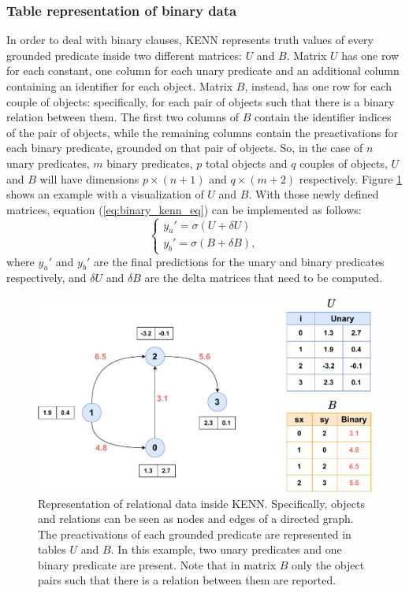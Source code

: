 \subsubsection{Table representation of binary data}

In order to deal with binary clauses, KENN represents truth values of every grounded predicate inside two different matrices: $U$ and $B$. Matrix $U$ has one row for each constant, one column for each unary predicate and an additional column containing an identifier for each object. Matrix $B$, instead, has one row for each couple of objects: specifically, for each pair of objects such that there is a binary relation between them. The first two columns of $B$ contain the identifier indices of the pair of objects, while the remaining columns contain the preactivations for each binary predicate, grounded on that pair of objects. So, in the case of $n$ unary predicates, $m$ binary predicates, $p$ total objects and $q$ couples of objects, $U$ and $B$ will have dimensions $p \times (n+1)$ and $ q \times (m+2)$ respectively. Figure \ref{fig:KENNrelationalrepr} shows an example with a visualization of $U$ and $B$. With those newly defined matrices, equation (\ref{eq:binary_kenn_eq}) can be implemented as follows:
\begin{equation*}
	\begin{cases}
	y_u' = \sigma(U+\delta U)\\
	y_b' = \sigma(B + \delta B),
	\end{cases}
	\end{equation*}
	where $y_u'$ and $y_b'$ are the final predictions for the unary and binary predicates respectively, and $\delta U$ and $\delta B$ are the delta matrices that need to be computed.
 
 \begin{figure}
 	\centering
 	\includegraphics[width=0.7\linewidth]{figures/kenn_relational_representation2.pdf}
 	\caption{Representation of relational data inside KENN. Specifically, objects and relations can be seen as nodes and edges of a directed graph. The preactivations of each grounded predicate are represented in tables $U$ and $B$. In this example, two unary predicates and one binary predicate are present. Note that in matrix $B$ only the object pairs such that there is a relation between them are reported.}
 	\label{fig:KENNrelationalrepr}
 \end{figure}

